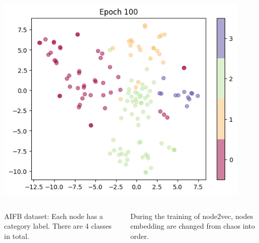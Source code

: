\documentclass[10pt, aspectratio=169]{beamer}
\begin{document}
\begin{frame}
\begin{columns}
\begin{column}{0.33\textwidth}
           \includegraphics[width=0.9\textwidth]{./graphics/epoch100.png}
       \end{column}
   \end{columns} 
   \vspace{0.2cm}
   \begin{columns}
       \begin{column}{0.5\textwidth}
           AIFB dataset: Each node has a category label. There are 4 classes in total.
       \end{column}
       \begin{column}{0.5\textwidth}
           During the training of node2vec, nodes embedding are changed from chaos into order.
       \end{column}
   \end{columns}
\end{frame}
\end{document}

